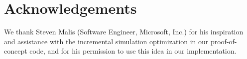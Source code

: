 \documentclass{article}
\begin{document}
\section*{Acknowledgements}

We thank Steven Malis (Software Engineer, Microsoft, Inc.) for his inspiration
and assistance with the incremental simulation optimization in our
proof-of-concept code, and for his permission to use this idea in our
implementation.


	
\end{document}
